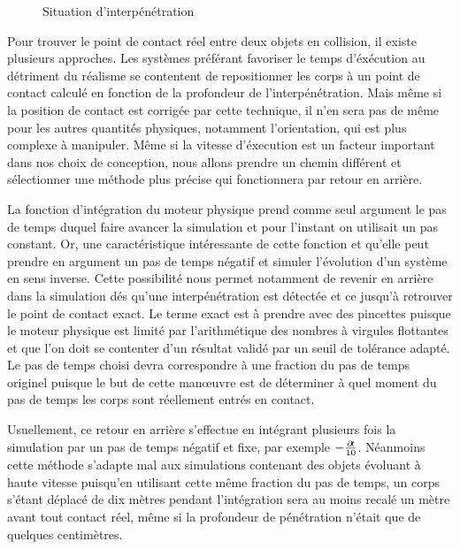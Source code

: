 \begin{figure}
  \centering
  
  \caption{Situation d'interpénétration}
\end{figure}

Pour trouver le point de contact réel entre deux objets en collision,
il existe plusieurs approches. Les systèmes préférant favoriser le
temps d'éxécution au détriment du réalisme se contentent de
repositionner les corps à un point de contact calculé en fonction de
la profondeur de l'interpénétration. Mais même si la position de
contact est corrigée par cette technique, il n'en sera pas de même
pour les autres quantités physiques, notamment l'orientation, qui est
plus complexe à manipuler. Même si la vitesse d'éxecution est un
facteur important dans nos choix de conception, nous allons prendre un
chemin différent et sélectionner une méthode plus précise qui
fonctionnera par retour en arrière.

La fonction d'intégration du moteur physique prend comme seul argument
le pas de temps duquel faire avancer la simulation et pour l'instant
on utilisait un pas constant. Or, une caractéristique intéressante de
cette fonction et qu'elle peut prendre en argument un pas de temps
négatif et simuler l'évolution d'un système en sens inverse. Cette
possibilité nous permet notamment de revenir en arrière dans la
simulation dés qu'une interpénétration est détectée et ce jusqu'à
retrouver le point de contact exact. Le terme \og exact \fg{} est à
prendre avec des pincettes puisque le moteur physique est limité par
l'arithmétique des nombres à virgules flottantes et que l'on doit se
contenter d'un résultat validé par un seuil de tolérance adapté. Le
pas de temps choisi devra correspondre à une fraction du pas de temps
originel puisque le but de cette man\oe uvre est de déterminer à quel
moment du pas de temps les corps sont réellement entrés en contact.

Usuellement, ce retour en arrière s'effectue en intégrant plusieurs
fois la simulation par un pas de temps négatif et fixe, par exemple
$-\frac{\partial \! t}{10}$. Néanmoins cette méthode s'adapte mal aux
simulations contenant des objets évoluant à haute vitesse puisqu'en
utilisant cette même fraction du pas de temps, un corps s'étant
déplacé de dix mètres pendant l'intégration sera au moins recalé un
mètre avant tout contact réel, même si la profondeur de pénétration
n'était que de quelques centimètres.

